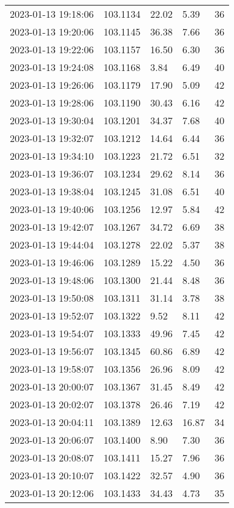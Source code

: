 \documentclass{nature_plusfigure}
\begin{document}
\begin{supplement}
\begin{center}
\begin{longtable}{lllll}
2023-01-13 19:18:06 & 103.1134 & 22.02 & 5.39 & 36 \\ 
2023-01-13 19:20:06 & 103.1145 & 36.38 & 7.66 & 36 \\ 
2023-01-13 19:22:06 & 103.1157 & 16.50 & 6.30 & 36 \\ 
2023-01-13 19:24:08 & 103.1168 & 3.84 & 6.49 & 40 \\ 
2023-01-13 19:26:06 & 103.1179 & 17.90 & 5.09 & 42 \\ 
2023-01-13 19:28:06 & 103.1190 & 30.43 & 6.16 & 42 \\ 
2023-01-13 19:30:04 & 103.1201 & 34.37 & 7.68 & 40 \\ 
2023-01-13 19:32:07 & 103.1212 & 14.64 & 6.44 & 36 \\ 
2023-01-13 19:34:10 & 103.1223 & 21.72 & 6.51 & 32 \\ 
2023-01-13 19:36:07 & 103.1234 & 29.62 & 8.14 & 36 \\ 
2023-01-13 19:38:04 & 103.1245 & 31.08 & 6.51 & 40 \\ 
2023-01-13 19:40:06 & 103.1256 & 12.97 & 5.84 & 42 \\ 
2023-01-13 19:42:07 & 103.1267 & 34.72 & 6.69 & 38 \\ 
2023-01-13 19:44:04 & 103.1278 & 22.02 & 5.37 & 38 \\ 
2023-01-13 19:46:06 & 103.1289 & 15.22 & 4.50 & 36 \\ 
2023-01-13 19:48:06 & 103.1300 & 21.44 & 8.48 & 36 \\ 
2023-01-13 19:50:08 & 103.1311 & 31.14 & 3.78 & 38 \\ 
2023-01-13 19:52:07 & 103.1322 & 9.52 & 8.11 & 42 \\ 
2023-01-13 19:54:07 & 103.1333 & 49.96 & 7.45 & 42 \\ 
2023-01-13 19:56:07 & 103.1345 & 60.86 & 6.89 & 42 \\ 
2023-01-13 19:58:07 & 103.1356 & 26.96 & 8.09 & 42 \\ 
2023-01-13 20:00:07 & 103.1367 & 31.45 & 8.49 & 42 \\ 
2023-01-13 20:02:07 & 103.1378 & 26.46 & 7.19 & 42 \\ 
2023-01-13 20:04:11 & 103.1389 & 12.63 & 16.87 & 34 \\ 
2023-01-13 20:06:07 & 103.1400 & 8.90 & 7.30 & 36 \\ 
2023-01-13 20:08:07 & 103.1411 & 15.27 & 7.96 & 36 \\ 
2023-01-13 20:10:07 & 103.1422 & 32.57 & 4.90 & 36 \\ 
2023-01-13 20:12:06 & 103.1433 & 34.43 & 4.73 & 35 \\ 

\end{longtable}
\end{center}
\end{supplement}
\end{document}
